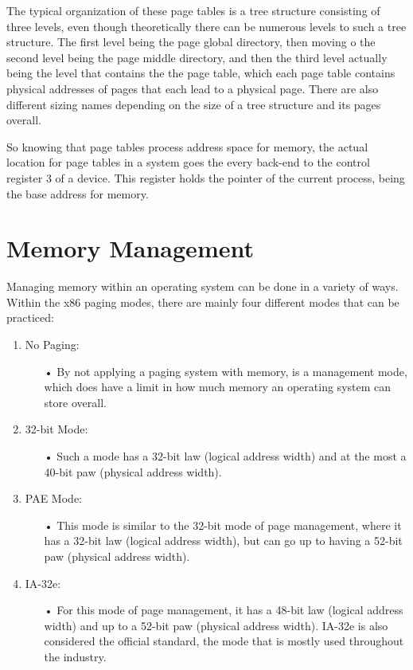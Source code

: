 \documentclass[letterpaper,10pt,onecolumn]{IEEEtran}
\begin{document}
\par
The typical organization of these page tables is a tree structure consisting of three levels, even though theoretically there can be numerous levels to such a tree structure. The first level being the page global directory, then moving o the second level being the page middle directory, and then the third level actually being the level that contains the the page table, which each page table contains physical addresses of pages that each lead to a physical page. There are also different sizing names depending on the size of a tree structure and its pages overall.
\par
So knowing that page tables process address space for memory, the actual location for page tables in a system goes the every back-end to the control register 3 of a device. This register holds the pointer of the current process, being the base address for memory.

\section*{Memory Management}
\par
Managing memory within an operating system can be done in a variety of ways. Within the x86 paging modes, there are mainly four different modes that can be practiced:

\begin{enumerate}
	\item No Paging:
		\begin{itemize}
			\item[•] By not applying a paging system with memory, is a management mode, which does have a limit in how much memory an operating system can store overall.
		\end{itemize}
	\item 32-bit Mode:
		\begin{itemize}
			\item[•] Such a mode has a 32-bit law (logical address width) and at the most a 40-bit paw (physical address width).
		\end{itemize}
	\item PAE Mode:
		\begin{itemize}
			\item[•] This mode is similar to the 32-bit mode of page management, where it has a 32-bit law (logical address width), but can go up to having a 52-bit paw (physical address width).
		\end{itemize}
	\item IA-32e:
		\begin{itemize}
			\item[•] For this mode of page management, it has a 48-bit law (logical address width) and up to a 52-bit paw (physical address width). IA-32e is also considered the official standard, the mode that is mostly used throughout the industry.
		\end{itemize}
\end{enumerate}
\end{document}

